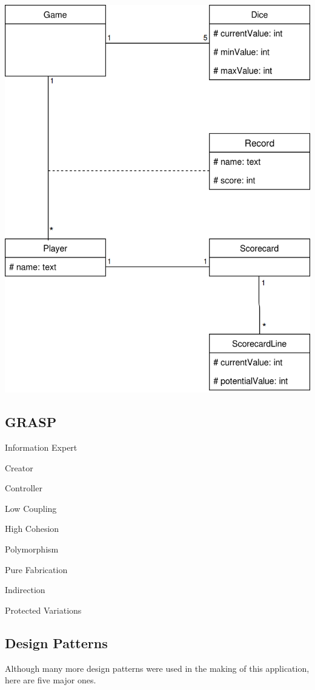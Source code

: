 \documentclass[12pt]{article}
\begin{document}
\includegraphics[scale=.3]{diagrams/domainModel.png}

\subsection*{GRASP}
\begin{list}{}{}
\item Information Expert
\item Creator
\item Controller
\item Low Coupling
\item High Cohesion
\item Polymorphism
\item Pure Fabrication
\item Indirection
\item Protected Variations
\end{list}
\subsection*{Design Patterns}
Although many more design patterns were used in the making of this application, here are five major ones.
\end{document}
